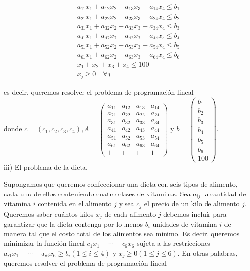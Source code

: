 \documentclass[10pt]{article}
\begin{document}
$$
\begin{gathered}
a_{11} x_{1}+a_{12} x_{2}+a_{13} x_{3}+a_{14} x_{4} \leq b_{1} \\
a_{21} x_{1}+a_{22} x_{2}+a_{23} x_{3}+a_{24} x_{4} \leq b_{2} \\
a_{31} x_{1}+a_{32} x_{2}+a_{33} x_{3}+a_{34} x_{4} \leq b_{3} \\
a_{41} x_{1}+a_{42} x_{2}+a_{43} x_{3}+a_{44} x_{4} \leq b_{4} \\
a_{51} x_{1}+a_{52} x_{2}+a_{53} x_{3}+a_{54} x_{4} \leq b_{5} \\
a_{61} x_{1}+a_{62} x_{2}+a_{63} x_{3}+a_{64} x_{4} \leq b_{6} \\
x_{1}+x_{2}+x_{3}+x_{4} \leq 100 \\
x_{j} \geq 0 \quad \forall j
\end{gathered}
$$

es decir, queremos resolver el problema de programación lineal\\
donde $c=\left(c_{1}, c_{2}, c_{3}, c_{4}\right), A=\left(\begin{array}{cccc}a_{11} & a_{12} & a_{13} & a_{14} \\ a_{21} & a_{22} & a_{23} & a_{24} \\ a_{31} & a_{32} & a_{33} & a_{34} \\ a_{41} & a_{42} & a_{43} & a_{44} \\ a_{51} & a_{52} & a_{53} & a_{54} \\ a_{61} & a_{62} & a_{63} & a_{64} \\ 1 & 1 & 1 & 1\end{array}\right)$ y $b=\left(\begin{array}{c}b_{1} \\ b_{2} \\ b_{3} \\ b_{4} \\ b_{5} \\ b_{6} \\ 100\end{array}\right)$.\\
iii) El problema de la dieta.

Supongamos que queremos confeccionar una dieta con seis tipos de alimento, cada uno de ellos conteniendo cuatro clases de vitaminas. Sea $a_{i j}$ la cantidad de vitamina $i$ contenida en el alimento $j$ y sea $c_{j}$ el precio de un kilo de alimento $j$. Queremos saber cuántos kilos $x_{j}$ de cada alimento $j$ debemos incluír para garantizar que la dieta contenga por lo menos $b_{i}$ unidades de vitamina $i$ de manera tal que el costo total de los alimentos sea mínimo. Es decir, queremos minimizar la función lineal $c_{1} x_{1}+\cdots+c_{6} x_{6}$ sujeta a las restricciones $a_{i 1} x_{1}+\cdots+a_{i 6} x_{6} \geq b_{i}(1 \leq i \leq 4)$ y $x_{j} \geq 0(1 \leq j \leq 6)$. En otras palabras, queremos resolver el problema de programación lineal
\end{document}
